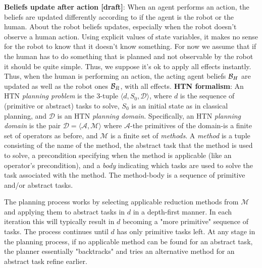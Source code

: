 \documentclass[letterpaper]{article} %
\begin{document}
\textbf{Beliefs update after action [draft]}: 
When an agent performs an action, the beliefs are updated differently according to if the agent is the robot or the human. 
About the robot beliefs updates, especially when the robot doesn't observe a human action. Using explicit values of state variables, it makes no sense for the robot to know that it doesn't know something.
For now we assume that if the human has to do something that is planned and not observable by the robot it should be quite simple. Thus, we suppose it's ok to apply all effects instantly.
Thus, when the human is performing an action, the acting agent beliefs $\mathcal{B}_H$ are updated as well as the robot ones $\mathcal{B}_R$, with all effects.
\textbf{HTN formalism}:
An HTN \textit{planning problem} is the 3-tuple $\langle d, S_0, \mathcal{D} \rangle$, where $d$ is the sequence of (primitive or abstract) tasks to solve, $S_0$ is an initial state as in classical planning, and $\mathcal{D}$ is an HTN \textit{planning domain}. Specifically, an HTN \textit{planning domain} is the pair $\mathcal{D}=\langle\mathcal{A},\mathcal{M}\rangle$ where $\mathcal{A}$-the primitives of the domain-is a finite set of operators as before, and $\mathcal{M}$ is a finite set of \textit{methods}. A \textit{method} is a tuple consisting of the name of the method, the abstract task that the method is used to solve, a precondition specifying when the method is applicable (like an operator's precondition), and a \textit{body} indicating which tasks are used to solve the task associated with the method. The method-body is a sequence of primitive and/or abstract tasks. 

The planning process works by selecting applicable reduction methods from $\mathcal{M}$ and applying them to abstract tasks in $d$ in a depth-first manner. In each iteration this will typically result in $d$ becoming a "more primitive" sequence of tasks. The process continues until $d$ has only primitive tasks left. At any stage in the planning process, if no applicable method can be found for an abstract task, the planner essentially "backtracks" and tries an alternative method for an abstract task refine earlier.
\end{document}

